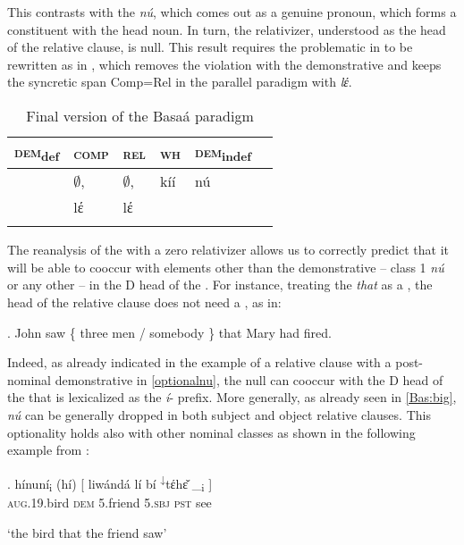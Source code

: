 \vskip -0.75cm
\noindent
This contrasts with the  \textit{n\'u}, which comes out as a genuine  pronoun, which forms a constituent with the head noun. In turn, the relativizer, understood as the head of the relative clause, is null. This result requires the problematic  in  to be rewritten as in , which removes the  violation with the demonstrative and keeps the syncretic span Comp=Rel in the parallel paradigm with \textit{lέ}.

\begin{table}
\caption{Final version of the Basa\'a paradigm}
\label{table4}
\begin{tabular}[h]{ l l l l l l }
\lsptoprule
\textsc{dem}\textsubscript{def} & \textsc{comp} 	& \textsc{rel}  	& \textsc{wh} & \textsc{dem}\textsubscript{indef}\\	
\midrule
 & $\emptyset$\cellcolor[gray]{0.9}, & $\emptyset$\cellcolor[gray]{0.9}, & k\'i\'i  & n\'u\\
   & lέ\cellcolor[gray]{0.8} & lέ\cellcolor[gray]{0.8} & \\
\lspbottomrule
\end{tabular}
\end{table}

\noindent
The reanalysis of the  with a zero relativizer allows us to correctly predict that it will be able to cooccur with elements other than the demonstrative -- class 1 \textit{n\'u} or any other -- in the D head of the . For instance, treating the  \textit{that} as a , the head of the relative clause does not need a , as in:

\ex. John saw \{ three men / somebody \} that Mary had fired.

Indeed, as already indicated in the example of a relative clause with a post-nominal demonstrative in \ref{optionalnu}, the null  can cooccur with the D head of the  that is lexicalized as the \textit{\'i}- prefix.  More generally, as already seen in \ref{Bas:big}, \textit{n\'u} can be generally dropped in both subject and object relative clauses. This optionality holds also with other nominal classes  as shown in the following example from \citet[18]{Jenks-etall}:

\exg. 
h\'inun\'i\textsubscript{i} (h\'i) [ liw\'and\'a l\'i b\'i \textsuperscript{↓}tέhɛ̌  \_\textsubscript{i} ]\\
\textsc{aug}.19.bird \textsc{dem} {} 5.friend 5.\textsc{sbj} \textsc{pst} see \\
\strut `the bird that the friend saw'



